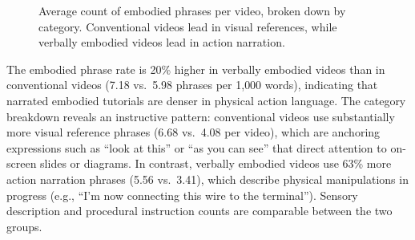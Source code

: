 \begin{figure}[h!]
    \centering
    \caption{Average count of embodied phrases per video, broken down by category. Conventional videos lead in visual references, while verbally embodied videos lead in action narration.}
    \label{fig:cat_breakdown}
\end{figure}

The embodied phrase rate is 20\% higher in verbally embodied videos than in conventional videos (7.18 vs.\ 5.98 phrases per 1{,}000 words), indicating that narrated embodied tutorials are denser in physical action language. The category breakdown reveals an instructive pattern: conventional videos use substantially more visual reference phrases (6.68 vs.\ 4.08 per video), which are anchoring expressions such as ``look at this'' or ``as you can see'' that direct attention to on-screen slides or diagrams. In contrast, verbally embodied videos use 63\% more action narration phrases (5.56 vs.\ 3.41), which describe physical manipulations in progress (e.g., ``I'm now connecting this wire to the terminal''). Sensory description and procedural instruction counts are comparable between the two groups.

